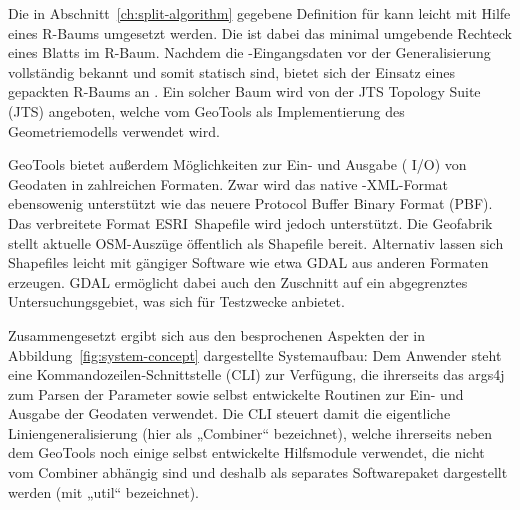 \documentclass[../main/thesis.tex]{subfiles}
\begin{document}
Die in Abschnitt~\ref{ch:split-algorithm} gegebene Definition für  kann leicht mit Hilfe eines R-Baums umgesetzt werden.
Die  ist dabei das minimal umgebende Rechteck eines Blatts im R-Baum.
Nachdem die \osm-Eingangsdaten vor der Generalisierung vollständig bekannt und somit statisch sind, bietet sich der Einsatz eines gepackten R-Baums an .
Ein solcher Baum wird von der JTS Topology Suite (JTS) angeboten, welche vom  GeoTools als Implementierung des Geometriemodells verwendet wird.

GeoTools bietet außerdem Möglichkeiten zur Ein- und Ausgabe ( I/O) von Geodaten in zahlreichen Formaten.
Zwar wird das native \osm-XML-Format ebensowenig unterstützt wie das neuere Protocol Buffer Binary Format (PBF).
Das verbreitete Format ESRI~Shapefile wird jedoch unterstützt.
Die Geofabrik stellt aktuelle OSM-Auszüge öffentlich als Shapefile bereit.
Alternativ lassen sich Shapefiles leicht mit gängiger Software wie etwa GDAL aus anderen Formaten erzeugen.
GDAL ermöglicht dabei auch den Zuschnitt auf ein abgegrenztes Untersuchungsgebiet, was sich für Testzwecke anbietet.


Zusammengesetzt ergibt sich aus den besprochenen Aspekten der in Abbildung~\ref{fig:system-concept} dargestellte Systemaufbau:
Dem Anwender steht eine Kommandozeilen-Schnittstelle (CLI) zur Verfügung, die ihrerseits das  args4j zum Parsen der Parameter sowie selbst entwickelte Routinen zur Ein- und Ausgabe der Geodaten verwendet.
Die CLI steuert damit die eigentliche Liniengeneralisierung (hier als „Combiner“ bezeichnet), welche ihrerseits neben dem  GeoTools noch einige selbst entwickelte Hilfsmodule verwendet, die nicht vom Combiner abhängig sind und deshalb als separates Softwarepaket dargestellt werden (mit „util“ bezeichnet).
\end{document}
